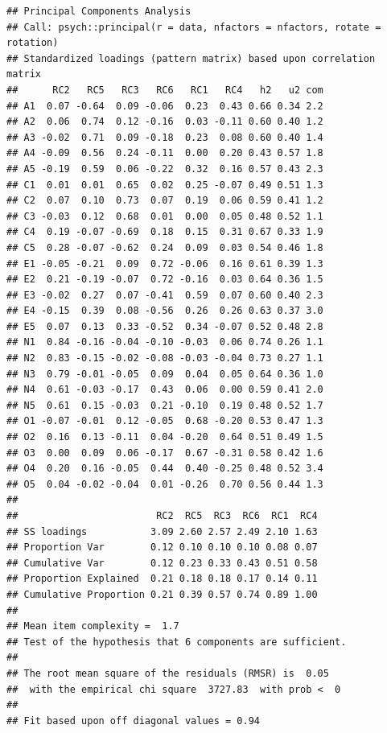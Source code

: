 \documentclass[
]{ctexart}
\newenvironment{Shaded}{\begin{snugshade}}{\end{snugshade}}
\newcommand{\NormalTok}[1]{#1}
\newcommand{\SpecialCharTok}[1]{\textcolor[rgb]{0.81,0.36,0.00}{\textbf{#1}}}
\begin{document}
\begin{Shaded}
\end{Shaded}

\begin{verbatim}
## Principal Components Analysis
## Call: psych::principal(r = data, nfactors = nfactors, rotate = rotation)
## Standardized loadings (pattern matrix) based upon correlation matrix
##      RC2   RC5   RC3   RC6   RC1   RC4   h2   u2 com
## A1  0.07 -0.64  0.09 -0.06  0.23  0.43 0.66 0.34 2.2
## A2  0.06  0.74  0.12 -0.16  0.03 -0.11 0.60 0.40 1.2
## A3 -0.02  0.71  0.09 -0.18  0.23  0.08 0.60 0.40 1.4
## A4 -0.09  0.56  0.24 -0.11  0.00  0.20 0.43 0.57 1.8
## A5 -0.19  0.59  0.06 -0.22  0.32  0.16 0.57 0.43 2.3
## C1  0.01  0.01  0.65  0.02  0.25 -0.07 0.49 0.51 1.3
## C2  0.07  0.10  0.73  0.07  0.19  0.06 0.59 0.41 1.2
## C3 -0.03  0.12  0.68  0.01  0.00  0.05 0.48 0.52 1.1
## C4  0.19 -0.07 -0.69  0.18  0.15  0.31 0.67 0.33 1.9
## C5  0.28 -0.07 -0.62  0.24  0.09  0.03 0.54 0.46 1.8
## E1 -0.05 -0.21  0.09  0.72 -0.06  0.16 0.61 0.39 1.3
## E2  0.21 -0.19 -0.07  0.72 -0.16  0.03 0.64 0.36 1.5
## E3 -0.02  0.27  0.07 -0.41  0.59  0.07 0.60 0.40 2.3
## E4 -0.15  0.39  0.08 -0.56  0.26  0.26 0.63 0.37 3.0
## E5  0.07  0.13  0.33 -0.52  0.34 -0.07 0.52 0.48 2.8
## N1  0.84 -0.16 -0.04 -0.10 -0.03  0.06 0.74 0.26 1.1
## N2  0.83 -0.15 -0.02 -0.08 -0.03 -0.04 0.73 0.27 1.1
## N3  0.79 -0.01 -0.05  0.09  0.04  0.05 0.64 0.36 1.0
## N4  0.61 -0.03 -0.17  0.43  0.06  0.00 0.59 0.41 2.0
## N5  0.61  0.15 -0.03  0.21 -0.10  0.19 0.48 0.52 1.7
## O1 -0.07 -0.01  0.12 -0.05  0.68 -0.20 0.53 0.47 1.3
## O2  0.16  0.13 -0.11  0.04 -0.20  0.64 0.51 0.49 1.5
## O3  0.00  0.09  0.06 -0.17  0.67 -0.31 0.58 0.42 1.6
## O4  0.20  0.16 -0.05  0.44  0.40 -0.25 0.48 0.52 3.4
## O5  0.04 -0.02 -0.04  0.01 -0.26  0.70 0.56 0.44 1.3
## 
##                        RC2  RC5  RC3  RC6  RC1  RC4
## SS loadings           3.09 2.60 2.57 2.49 2.10 1.63
## Proportion Var        0.12 0.10 0.10 0.10 0.08 0.07
## Cumulative Var        0.12 0.23 0.33 0.43 0.51 0.58
## Proportion Explained  0.21 0.18 0.18 0.17 0.14 0.11
## Cumulative Proportion 0.21 0.39 0.57 0.74 0.89 1.00
## 
## Mean item complexity =  1.7
## Test of the hypothesis that 6 components are sufficient.
## 
## The root mean square of the residuals (RMSR) is  0.05 
##  with the empirical chi square  3727.83  with prob <  0 
## 
## Fit based upon off diagonal values = 0.94
\end{verbatim}
\end{document}
